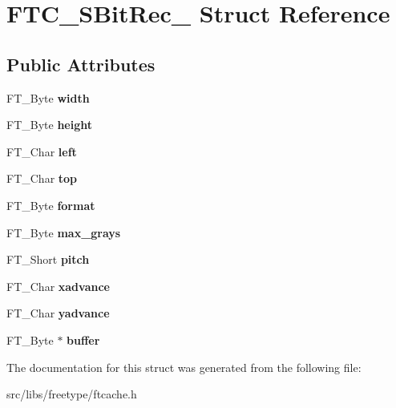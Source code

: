 \hypertarget{struct_f_t_c___s_bit_rec__}{
\section{FTC\_\-SBitRec\_\- Struct Reference}
\label{struct_f_t_c___s_bit_rec__}
}
\subsection*{Public Attributes}
\begin{DoxyCompactItemize}
\item 
\hypertarget{struct_f_t_c___s_bit_rec___a5b92fb4f213a880f758bb87ac2ceb263}{
FT\_\-Byte {\bfseries width}}
\label{struct_f_t_c___s_bit_rec___a5b92fb4f213a880f758bb87ac2ceb263}

\item 
\hypertarget{struct_f_t_c___s_bit_rec___a5953efe2aded3b184875d5e5d08cafef}{
FT\_\-Byte {\bfseries height}}
\label{struct_f_t_c___s_bit_rec___a5953efe2aded3b184875d5e5d08cafef}

\item 
\hypertarget{struct_f_t_c___s_bit_rec___aef273749f4fdb9943500ec6df8412a94}{
FT\_\-Char {\bfseries left}}
\label{struct_f_t_c___s_bit_rec___aef273749f4fdb9943500ec6df8412a94}

\item 
\hypertarget{struct_f_t_c___s_bit_rec___a3e558b3a04b70f00f80b862cdc94d9a2}{
FT\_\-Char {\bfseries top}}
\label{struct_f_t_c___s_bit_rec___a3e558b3a04b70f00f80b862cdc94d9a2}

\item 
\hypertarget{struct_f_t_c___s_bit_rec___a3d3fcc2869ce5c95f0f63898e6cef8be}{
FT\_\-Byte {\bfseries format}}
\label{struct_f_t_c___s_bit_rec___a3d3fcc2869ce5c95f0f63898e6cef8be}

\item 
\hypertarget{struct_f_t_c___s_bit_rec___a83958d4649a898312de9a7274550dff9}{
FT\_\-Byte {\bfseries max\_\-grays}}
\label{struct_f_t_c___s_bit_rec___a83958d4649a898312de9a7274550dff9}

\item 
\hypertarget{struct_f_t_c___s_bit_rec___a1382ec014df599e706c2c1785bc18235}{
FT\_\-Short {\bfseries pitch}}
\label{struct_f_t_c___s_bit_rec___a1382ec014df599e706c2c1785bc18235}

\item 
\hypertarget{struct_f_t_c___s_bit_rec___a502a0bb69d973d2ae626a842eb9fefd3}{
FT\_\-Char {\bfseries xadvance}}
\label{struct_f_t_c___s_bit_rec___a502a0bb69d973d2ae626a842eb9fefd3}

\item 
\hypertarget{struct_f_t_c___s_bit_rec___aabe767ddaf7ff62918886c6f62e9ac28}{
FT\_\-Char {\bfseries yadvance}}
\label{struct_f_t_c___s_bit_rec___aabe767ddaf7ff62918886c6f62e9ac28}

\item 
\hypertarget{struct_f_t_c___s_bit_rec___abe4d78fc3f411d67e7fc43f7aa21bd1d}{
FT\_\-Byte $\ast$ {\bfseries buffer}}
\label{struct_f_t_c___s_bit_rec___abe4d78fc3f411d67e7fc43f7aa21bd1d}

\end{DoxyCompactItemize}


The documentation for this struct was generated from the following file:\begin{DoxyCompactItemize}
\item 
src/libs/freetype/ftcache.h\end{DoxyCompactItemize}
